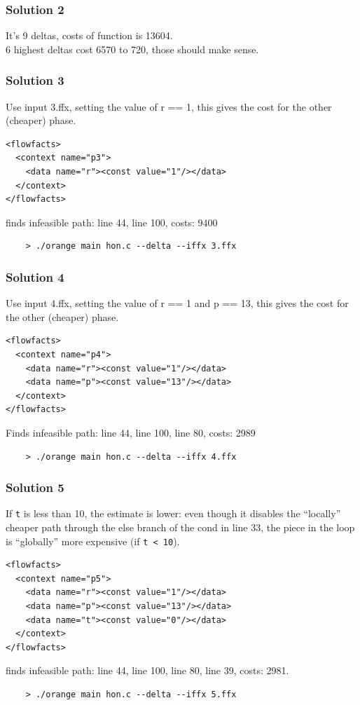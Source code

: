 \documentclass{beamer}
\begin{document}
\begin{frame}[fragile]
  \frametitle{Solution 2}
  It's 9 deltas, costs of function is 13604. \\
  6 highest deltas cost 6570 to 720, those should make sense.
\end{frame}



\begin{frame}[fragile]
  \frametitle{Solution 3}
  Use input 3.ffx, setting the value of r == 1, this gives the cost for the other (cheaper) phase.
  {\small
  \begin{verbatim}
<flowfacts>
  <context name="p3">
    <data name="r"><const value="1"/></data>
  </context>
</flowfacts>
  \end{verbatim}
  }
  finds infeasible path: line 44, line 100, costs: 9400 
  {\small
  \begin{verbatim}
    > ./orange main hon.c --delta --iffx 3.ffx
  \end{verbatim}
  }
\end{frame}



\begin{frame}[fragile]
  \frametitle{Solution 4}
  Use input 4.ffx, setting the value of r == 1 and p == 13,
  this gives the cost for the other (cheaper) phase.
  {\small
  \begin{verbatim}
<flowfacts>
  <context name="p4">
    <data name="r"><const value="1"/></data>
    <data name="p"><const value="13"/></data>
  </context>
</flowfacts>
  \end{verbatim}
  }
  Finds infeasible path: line 44, line 100, line 80, costs: 2989
  {\small
  \begin{verbatim}
    > ./orange main hon.c --delta --iffx 4.ffx
  \end{verbatim}
  }
\end{frame}



\begin{frame}[fragile]
  \frametitle{Solution 5}
  If {\tt t} is less than 10, the estimate is lower: even though it disables
  the ``locally'' cheaper path through the else branch of the cond in line 33,
  the piece in the loop is ``globally'' more expensive (if {\tt t < 10}).
  {\small
  \begin{verbatim}
<flowfacts>
  <context name="p5">
    <data name="r"><const value="1"/></data>
    <data name="p"><const value="13"/></data>
    <data name="t"><const value="0"/></data>
  </context>
</flowfacts>
  \end{verbatim}
  }
  finds infeasible path: line 44, line 100, line 80, line 39, costs: 2981.
  {\small
  \begin{verbatim}
    > ./orange main hon.c --delta --iffx 5.ffx
  \end{verbatim}
  }
\end{frame}
\end{document}
